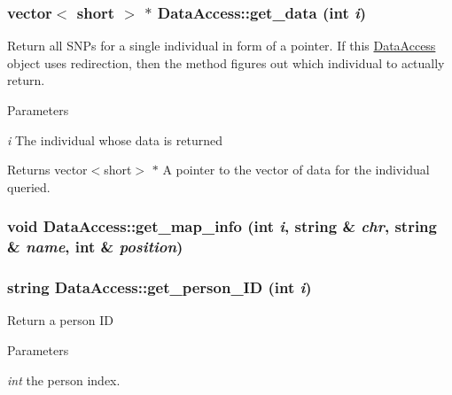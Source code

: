 \label{classDataAccess_aa4ffa6d4d9cf70fb34a3ab1d8227e895}
\hypertarget{classDataAccess_a8085d15c2180ac572bc39e937171a256}{
\subsubsection[{get\_\-data}]{\setlength{\rightskip}{0pt plus 5cm}vector$<$ short $>$ $\ast$ DataAccess::get\_\-data (int {\em i})}}
\label{classDataAccess_a8085d15c2180ac572bc39e937171a256}
Return all SNPs for a single individual in form of a pointer. If this \hyperlink{classDataAccess}{DataAccess} object uses redirection, then the method figures out which individual to actually return.


\begin{DoxyParams}{Parameters}
\item[{\em i}]The individual whose data is returned \end{DoxyParams}
\begin{DoxyReturn}{Returns}
vector$<$short$>$ $\ast$ A pointer to the vector of data for the individual queried. 
\end{DoxyReturn}
\hypertarget{classDataAccess_ac4f80d59b3ff2178f456f7907bb2479a}{
\subsubsection[{get\_\-map\_\-info}]{\setlength{\rightskip}{0pt plus 5cm}void DataAccess::get\_\-map\_\-info (int {\em i}, \/  string \& {\em chr}, \/  string \& {\em name}, \/  int \& {\em position})}}
\label{classDataAccess_ac4f80d59b3ff2178f456f7907bb2479a}
\hypertarget{classDataAccess_ae446b940e538a5d09f651c4908e08804}{
\subsubsection[{get\_\-person\_\-ID}]{\setlength{\rightskip}{0pt plus 5cm}string DataAccess::get\_\-person\_\-ID (int {\em i})}}
\label{classDataAccess_ae446b940e538a5d09f651c4908e08804}
Return a person ID 
\begin{DoxyParams}{Parameters}
\item[{\em int}]the person index. \end{DoxyParams}
